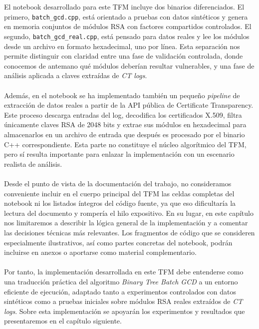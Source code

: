 \\
\\
El notebook desarrollado para este TFM incluye dos binarios diferenciados. El primero, \texttt{batch\_gcd.cpp}, está orientado a pruebas con datos sintéticos y genera en memoria conjuntos de módulos RSA con factores compartidos controlados. El segundo, \texttt{batch\_gcd\_real.cpp}, está pensado para datos reales y lee los módulos desde un archivo en formato hexadecimal, uno por línea. Esta separación nos permite distinguir con claridad entre una fase de validación controlada, donde conocemos de antemano qué módulos deberían resultar vulnerables, y una fase de análisis aplicada a claves extraídas de \textit{CT logs}.
\\
\\
Además, en el notebook se ha implementado también un pequeño \textit{pipeline} de extracción de datos reales a partir de la API pública de Certificate Transparency. Este proceso descarga entradas del log, decodifica los certificados X.509, filtra únicamente claves RSA de 2048 bits y extrae sus módulos en hexadecimal para almacenarlos en un archivo de entrada que después es procesado por el binario C++ correspondiente. Esta parte no constituye el núcleo algorítmico del TFM, pero sí resulta importante para enlazar la implementación con un escenario realista de análisis.
\\
\\
Desde el punto de vista de la documentación del trabajo, no consideramos conveniente incluir en el cuerpo principal del TFM las celdas completas del notebook ni los listados íntegros del código fuente, ya que eso dificultaría la lectura del documento y rompería el hilo expositivo. En su lugar, en este capítulo nos limitaremos a describir la lógica general de la implementación y a comentar las decisiones técnicas más relevantes. Los fragmentos de código que se consideren especialmente ilustrativos, así como partes concretas del notebook, podrán incluirse en anexos o aportarse como material complementario.
\\
\\
Por tanto, la implementación desarrollada en este TFM debe entenderse como una traducción práctica del algoritmo \textit{Binary Tree Batch GCD} a un entorno eficiente de ejecución, adaptado tanto a experimentos controlados con datos sintéticos como a pruebas iniciales sobre módulos RSA reales extraídos de \textit{CT logs}. Sobre esta implementación se apoyarán los experimentos y resultados que presentaremos en el capítulo siguiente.